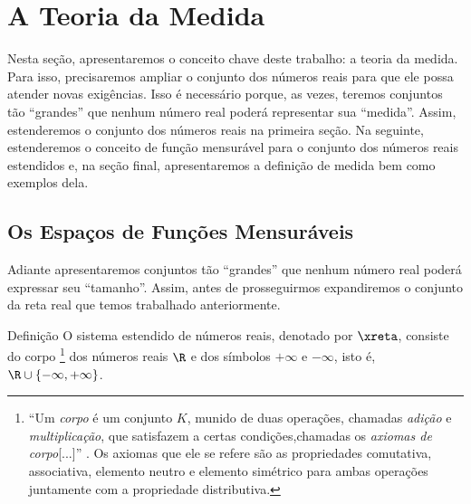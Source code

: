 \chapter{A Teoria da Medida}
    Nesta seção, apresentaremos o conceito chave deste trabalho: a teoria da medida.
    Para isso, precisaremos ampliar o conjunto dos números reais para que ele possa atender novas exigências.
    Isso é necessário porque, as vezes, teremos conjuntos tão \enquote{grandes} que nenhum número real poderá representar sua \enquote{medida}. 
    Assim, estenderemos o conjunto dos números reais na primeira seção.
    Na seguinte, estenderemos o conceito de função mensurável para o conjunto dos números reais estendidos e, na seção final, apresentaremos a definição de medida bem como exemplos dela.
    
\section{Os Espaços de Funções Mensuráveis}
	Adiante apresentaremos conjuntos tão \enquote{grandes} que nenhum número real poderá expressar seu \enquote{tamanho}.
	Assim, antes de prosseguirmos expandiremos o conjunto da reta real que temos trabalhado anteriormente.
    \begin{env}{Definição}
    \label{def:reta-estendida}
        O sistema estendido de números reais, denotado por $\xreta$, consiste do corpo
        \footnote{
        \enquote{Um \textit{corpo} é um conjunto $K$, munido de duas operações, chamadas \textit{adição} e \textit{multiplicação}, que satisfazem a certas condições,chamadas os \textit{axiomas de corpo}[...]}
        \cite[p.61]{elon}. Os axiomas que ele se refere são as propriedades comutativa, associativa, elemento neutro e elemento simétrico para ambas operações juntamente com  
        a propriedade distributiva.
    	} 
        dos números reais $\R$ e dos símbolos $+\infty$ e $-\infty$, isto é, $\R \cup \{-\infty, +\infty\}$.
    \end{env}
	

